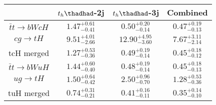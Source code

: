 \centering
\begin{tabular}{|c|c|c|c|} \toprule\toprule
 & $t_h\thadhad$-2j & $t_h\thadhad$-3j & Combined\\\midrule
$\bar{t}t\to bWcH$ & $1.47^{+0.61}_{-0.41}$ & $0.50^{+0.20}_{-0.14}$ & $0.47^{+0.19}_{-0.13}$\\
$cg\to tH$ & $9.51^{+4.01}_{-2.66}$ & $12.90^{+4.95}_{-3.60}$ & $7.67^{+3.11}_{-2.14}$\\
tcH merged & $1.27^{+0.53}_{-0.36}$ & $0.49^{+0.19}_{-0.14}$ & $0.45^{+0.18}_{-0.12}$\\
$\bar{t}t\to bWuH$ & $1.44^{+0.60}_{-0.40}$ & $0.48^{+0.19}_{-0.14}$ & $0.45^{+0.18}_{-0.13}$\\
$ug\to tH$ & $1.50^{+0.64}_{-0.42}$ & $2.50^{+0.96}_{-0.70}$ & $1.28^{+0.53}_{-0.36}$\\
tuH merged & $0.74^{+0.31}_{-0.21}$ & $0.41^{+0.16}_{-0.11}$ & $0.35^{+0.14}_{-0.10}$\\
\bottomrule\bottomrule
\end{tabular}
